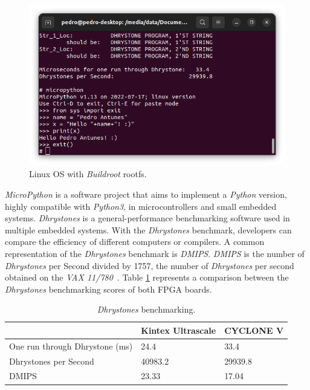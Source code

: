 \begin{figure}[!ht]
    \centering
    \includegraphics[width=\linewidth]{../images/linux_buildroot_fpga.png}
    \caption{Linux OS with \textit{Buildroot} rootfs.}
    \label{fig:linux_buildroot_fpga}
\end{figure}

\textit{MicroPython} is a software project that aims to implement a \textit{Python} version, highly compatible with \textit{Python3}, in microcontrollers and small embedded systems. \textit{Dhrystones} is a general-performance benchmarking software used in multiple embedded systems. With the \textit{Dhrystones} benchmark, developers can compare the efficiency of different computers or compilers. A common representation of the \textit{Dhrystones} benchmark is \textit{DMIPS}. \textit{DMIPS} is the number of \textit{Dhrystones} per Second divided by 1757, the number of \textit{Dhrystones} per second obtained on the \textit{VAX 11/780}~\cite{emer1984characterization}. Table \ref{tab:dhrystones} represents a comparison between the \textit{Dhrystones} benchmarking scores of both FPGA boards.

\begin{table}[!ht]
    \centering
    \begin{tabular}{l|l|l|}
    \cline{2-3}
                                                         & \textbf{Kintex Ultrascale} & \textbf{CYCLONE V} \\ \hline
    \multicolumn{1}{|l|}{One run through Dhrystone (ms)} & 24.4                       & 33.4               \\ \hline
    \multicolumn{1}{|l|}{Dhrystones per Second}          & 40983.2                    & 29939.8            \\ \hline
    \multicolumn{1}{|l|}{DMIPS}                          & 23.33                      & 17.04            \\ \hline
    \end{tabular}
    \caption{\textit{Dhrystones} benchmarking.}
    \label{tab:dhrystones}
\end{table}

